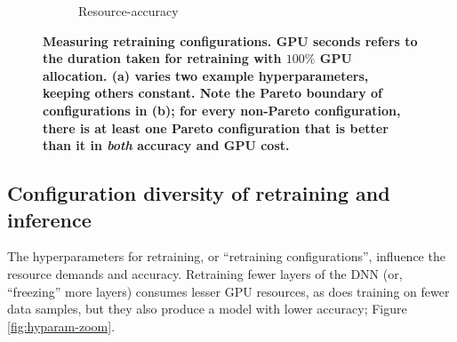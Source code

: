 \begin{figure}[t]
\begin{subfigure}[t]{0.48\linewidth}
    \caption{\small Resource-accuracy}
    \label{fig:darmstadt-profile}
  \end{subfigure}  
  \caption{\bf\small Measuring retraining configurations. %
  GPU seconds refers to the duration taken for retraining with $100\%$ GPU allocation. (a) varies two example hyperparameters, keeping others constant. Note the Pareto boundary of configurations in (b); for every non-Pareto configuration, there is at least one Pareto configuration that is better than it in {\em both} accuracy and GPU cost. }
  \label{fig:resource-profiles}
\end{figure}


\subsection{Configuration diversity of retraining and inference}
\label{subsec:profiles}

 The hyperparameters for retraining, or ``retraining configurations'', influence the resource demands and accuracy. %
Retraining fewer layers of the DNN (or, ``freezing'' more layers) consumes lesser GPU resources, as does training on fewer data samples, but they also produce a model with lower accuracy; Figure \ref{fig:hyparam-zoom}. %

